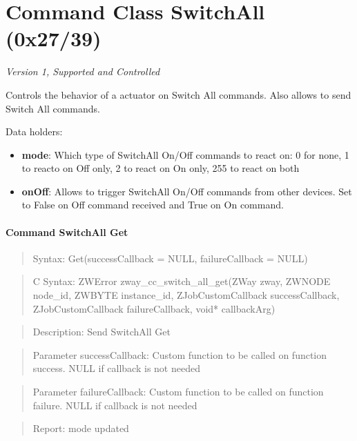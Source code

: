 \section{Command Class SwitchAll (0x27/39)}

\textit{Version 1, Supported and Controlled}
\newline

Controls the behavior of a actuator on Switch All commands. Also allows to send Switch All commands.
\newline

\noindent
Data holders:

\begin{itemize}
\item \textbf{mode}: Which type of SwitchAll On/Off commands to react on: 0 for none, 1 to reacto on Off only, 2 to react on On only, 255 to react on both
\item \textbf{onOff}: Allows to trigger SwitchAll On/Off commands from other devices. Set to False on Off command received and True on On command.
\end{itemize}

\paragraph{Command SwitchAll Get}
\begin{quote}Syntax: Get(successCallback = NULL, failureCallback = NULL)\end{quote}
\begin{quote}C Syntax: ZWError zway\_cc\_switch\_all\_get(ZWay zway, ZWNODE node\_id, ZWBYTE instance\_id, ZJobCustomCallback successCallback, ZJobCustomCallback failureCallback, void* callbackArg)\end{quote}
\begin{quote}Description: Send SwitchAll Get\end{quote}
\begin{quote}Parameter successCallback: Custom function to be called on function success. NULL if callback is not needed\end{quote}
\begin{quote}Parameter failureCallback: Custom function to be called on function failure. NULL if callback is not needed\end{quote}
\begin{quote}Report: mode updated\end{quote}

